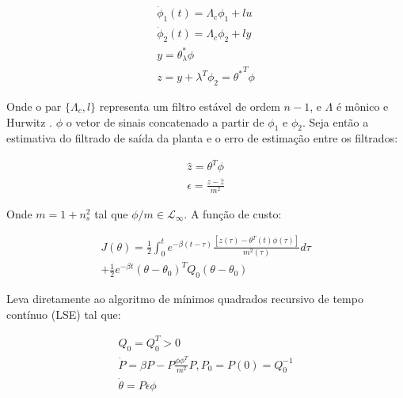 \documentclass[conference,harvard,brazil,english]{sbatex}
\begin{document}
\begin{equation}
\label{eq:sigmaIDMARC}
\displaystyle 
\begin{array}{l}

        \dot{\phi}_1(t) = \Lambda_c \phi_1 + lu       \\
        \dot{\phi}_2(t) = \Lambda_c \phi_2 + ly       \\
        y = \theta^*_\lambda \phi                     \\
        z = y + \lambda^T\phi_2 = {\theta^*}^T \phi  
         
\end{array}
\end{equation}

Onde o par  $\{ \Lambda_c, l \}$ representa um filtro estável de ordem $n-1$, e $\Lambda$ é mônico e Hurwitz . $\phi$ o vetor de sinais concatenado a partir de $\phi_1$ e $\phi_2$. Seja então a estimativa do filtrado de saída da planta e o erro de estimação entre os filtrados:

\begin{equation}
\displaystyle 
\begin{array}{l}

        \hat{z} = \theta^T \phi \\
        \epsilon = \frac{z - \hat{z}}{m^2}
         
\end{array}
\end{equation}

Onde $m = 1+n_s^2$ tal que $\phi/m \in \mathcal{L}_\infty$. A função de custo:

\begin{equation}
\displaystyle 
\begin{array}{r}

       J(\theta) = \frac{1}{2} \int_{0}^{t} e^{-\beta(t - \tau)} \frac{[z(\tau) - \theta^T(t)\phi(\tau)]}{m^2(\tau)} d\tau \\
        + \frac{1}{2} e^{-\beta t}(\theta - \theta_0)^TQ_0(\theta - \theta_0)
         
\end{array}
\end{equation}

Leva diretamente ao algoritmo de mínimos quadrados recursivo de tempo contínuo (LSE) tal que:

\begin{equation}
\displaystyle 
\begin{array}{l}
     Q_0 = Q_0^T > 0 \\
     \dot{P} = \beta P - P\frac{\phi \phi^T}{m^2} P, P_0 = P(0) = Q_0^{-1}\\
     \dot{\theta} = P\epsilon \phi
         
\end{array}
\end{equation}
\end{document}
